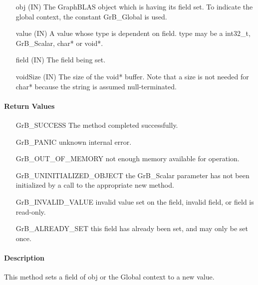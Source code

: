 \begin{itemize}[leftmargin=2.1in]
    \item[{\sf obj}] ({\sf IN}) The GraphBLAS object which is having its {\sf field} set.
                                To indicate the global context, the constant {\sf GrB\_Global} is used.
    \item[{\sf value}] ({\sf IN}) A value whose type is dependent on {\sf field}.
                                {\sf type} may be a {\sf int32\_t}, {\sf GrB\_Scalar}, {\sf char*} or {\sf void*}.
    \item[{\sf field}] ({\sf IN}) The field being set.
    \item[{\sf voidSize}] ({\sf IN}) The size of the {\sf void*} buffer. Note that a size is not needed for
                                {\sf char*} because the string is assumed null-terminated.
\end{itemize}

\paragraph{Return Values}

\begin{itemize}[leftmargin=2.1in]
    \item[{\sf GrB\_SUCCESS}]  The method completed successfully.
    \item[{\sf GrB\_PANIC}]             unknown internal error.
    \item[{\sf GrB\_OUT\_OF\_MEMORY}]          not enough memory available for operation.
    \item[{\sf GrB\_UNINITIALIZED\_OBJECT}]          the {\sf GrB\_Scalar} parameter has not been
                                        initialized by a call to the appropriate {\sf new} method.
    \item[{\sf GrB\_INVALID\_VALUE}]    invalid value set on the field, invalid field, or field is read-only.
    \item[{\sf GrB\_ALREADY\_SET}]  this field has already been set, and may only be set once. 
    \end{itemize}

\paragraph{Description}

This method sets a field of {\sf obj} or the Global context to a new value.